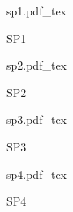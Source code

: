 \documentclass[a4paper]{article}
\newcommand{\incfig}[1]{%
    \def\svgwidth{\columnwidth}
    {#1.pdf_tex}
}
\begin{document}
\begin{figure}[ht]
    \centering
    \begin{minipage}[c][\totalheight][c]{0.5\columnwidth}
    \incfig{sp1}
    \caption{SP1}
    \end{minipage}
    \label{fig:sp1}
\end{figure}

\begin{figure}[ht]
    \centering
    \begin{minipage}[c][\totalheight][c]{0.5\columnwidth}
    \incfig{sp2}
    \caption{SP2}
    \end{minipage}
    \label{fig:sp2}
\end{figure}

\begin{figure}[ht]
    \centering
    \begin{minipage}[c][\totalheight][c]{\columnwidth}
    \incfig{sp3}
    \caption{SP3}
    \end{minipage}
    \label{fig:sp3}
\end{figure}

\begin{figure}[ht]
    \centering
    \begin{minipage}[c][\totalheight][c]{\columnwidth}
    \incfig{sp4}
    \caption{SP4}
    \end{minipage}
    \label{fig:sp4}
\end{figure}
\end{document}

